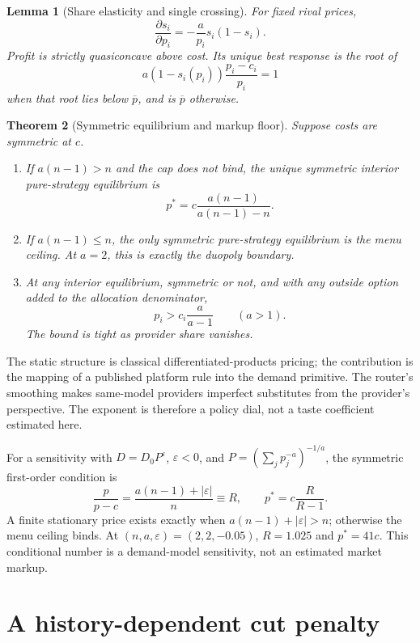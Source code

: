 \documentclass[11pt]{article}
\newtheorem{theorem}{Theorem}
\newtheorem{lemma}[theorem]{Lemma}
\newcommand{\1}{\mathbf{1}}
\newcommand{\pbar}{\overline p}
\begin{document}
\begin{lemma}[Share elasticity and single crossing]
For fixed rival prices,
\[
  \frac{\partial s_i}{\partial p_i}
  =-\frac{a}{p_i}s_i(1-s_i).
\]
Profit is strictly quasiconcave above cost.  Its unique best response is the
root of
\[
  a(1-s_i(p_i))\frac{p_i-c_i}{p_i}=1
\]
when that root lies below $\pbar$, and is $\pbar$ otherwise.
\end{lemma}

\begin{theorem}[Symmetric equilibrium and markup floor]
Suppose costs are symmetric at $c$.
\begin{enumerate}[label=(\roman*)]
  \item If $a(n-1)>n$ and the cap does not bind, the unique symmetric interior
  pure-strategy equilibrium is
  \[
    p^*=c\frac{a(n-1)}{a(n-1)-n}.
  \]
  \item If $a(n-1)\le n$, the only symmetric pure-strategy equilibrium is the
  menu ceiling.
  At $a=2$, this is exactly the duopoly boundary.
  \item At any interior equilibrium, symmetric or not, and with any outside
  option added to the allocation denominator,
  \[
    p_i>c_i\frac{a}{a-1}\qquad(a>1).
  \]
  The bound is tight as provider share vanishes.
\end{enumerate}
\label{thm:static}
\end{theorem}

The static structure is classical differentiated-products pricing; the
contribution is the mapping of a published platform rule into the demand
primitive.  The router's smoothing makes same-model providers imperfect
substitutes from the provider's perspective.  The exponent is therefore a
policy dial, not a taste coefficient estimated here.

For a sensitivity with $D=D_0P^\varepsilon$, $\varepsilon<0$, and
$P=(\sum_jp_j^{-a})^{-1/a}$, the symmetric first-order condition is
\begin{equation}
  \frac{p}{p-c}=
  \frac{a(n-1)+|\varepsilon|}{n}\equiv R,
  \qquad p^*=c\frac{R}{R-1}.
  \label{eq:elastic}
\end{equation}
A finite stationary price exists exactly when
$a(n-1)+|\varepsilon|>n$; otherwise the menu ceiling binds.  At
$(n,a,\varepsilon)=(2,2,-0.05)$, $R=1.025$ and $p^*=41c$.  This conditional
number is a demand-model sensitivity, not an estimated market markup.

\section{A history-dependent cut penalty}
\end{document}
